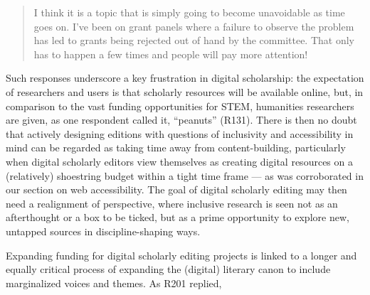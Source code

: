 \begin{paper}
\begin{quote}
I think it is a topic that is simply going to become unavoidable as time
goes on. I've been on grant panels where a failure to observe the
problem has led to grants being rejected out of hand by the committee.
That only has to happen a few times and people will pay more attention!
\end{quote}

Such responses underscore a key frustration in digital scholarship: the
expectation of researchers and users is that scholarly resources will be
available online, but, in comparison to the vast funding opportunities
for STEM, humanities researchers are given, as one respondent called it,
``peanuts'' (R131). There is then no doubt that actively designing
editions with questions of inclusivity and accessibility in mind can be
regarded as taking time away from content-building, particularly when
digital scholarly editors view themselves as creating digital resources
on a (relatively) shoestring budget within a tight time frame --- as was
corroborated in our section on web accessibility. The goal of digital
scholarly editing may then need a realignment of perspective, where
inclusive research is seen not as an afterthought or a box to be ticked,
but as a prime opportunity to explore new, untapped sources in
discipline-shaping ways.

Expanding funding for digital scholarly editing projects is linked to a
longer and equally critical process of expanding the (digital) literary
canon to include marginalized voices and themes. As R201 replied,


\end{paper}
